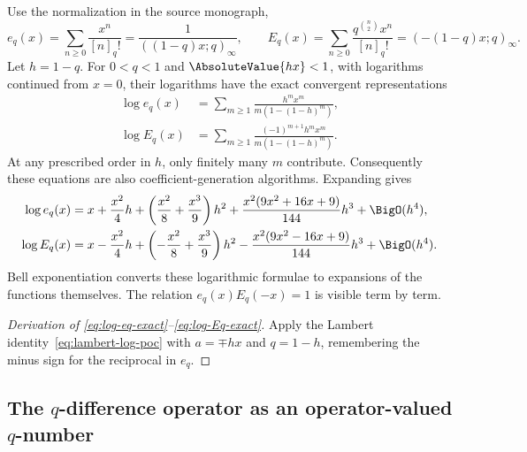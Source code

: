 \documentclass[11pt,oneside]{article}
\theoremstyle{definition}
\theoremstyle{remark}
\let\reportsubsection\subsection
\let\section\reportsubsection
\begin{document}
Use the normalization in the source monograph,
\[
 e_q(x)=\sum_{n\ge0}\frac{x^n}{[n]_q!}
 =\frac1{((1-q)x;q)_\infty},
 \qquad
 E_q(x)=\sum_{n\ge0}\frac{q^{\binom n2}x^n}{[n]_q!}
 =(-(1-q)x;q)_\infty.
\]
Let $h=1-q$.  For $0<q<1$ and $\AbsoluteValue{hx}<1$, with logarithms continued from
$x=0$, their logarithms have the exact convergent representations
\begin{align}
 \log e_q(x)&=\sum_{m\ge1}\frac{h^m x^m}{m(1-(1-h)^m)},\label{eq:log-eq-exact}\\
 \log E_q(x)&=\sum_{m\ge1}\frac{(-1)^{m+1}h^m x^m}
 {m(1-(1-h)^m)}.                                  \label{eq:log-Eq-exact}
\end{align}
At any prescribed order in $h$, only finitely many $m$ contribute.
Consequently these equations are also coefficient-generation algorithms.
Expanding gives
\begin{align}
 \log e_q(x)
 ={}&x+\frac{x^2}{4}h+
 \left(\frac{x^2}{8}+\frac{x^3}{9}\right)h^2
 +\frac{x^2(9x^2+16x+9)}{144}h^3+\BigO(h^4),
 \label{eq:eq-first}\\
 \log E_q(x)
 ={}&x-\frac{x^2}{4}h+
 \left(-\frac{x^2}{8}+\frac{x^3}{9}\right)h^2
 -\frac{x^2(9x^2-16x+9)}{144}h^3+\BigO(h^4).
 \label{eq:Eq-first}
\end{align}
Bell exponentiation converts these logarithmic formulae to expansions of the
functions themselves.  The relation $e_q(x)E_q(-x)=1$ is visible term by term.

\begin{proof}[Derivation of \eqref{eq:log-eq-exact}--\eqref{eq:log-Eq-exact}]
Apply the Lambert identity~\eqref{eq:lambert-log-poc} with
$a=\mp hx$ and $q=1-h$, remembering the minus sign for the reciprocal in
$e_q$.
\end{proof}

\section{The \texorpdfstring{$q$}{q}-difference operator as an operator-valued \texorpdfstring{$q$}{q}-number}
\end{document}

